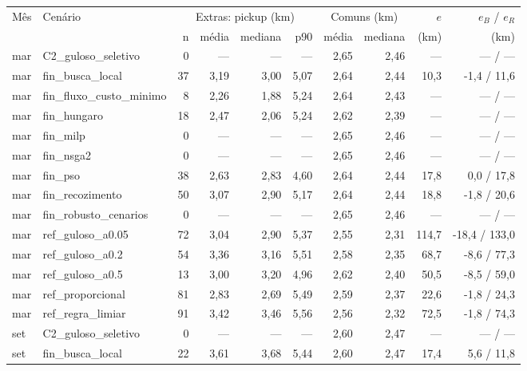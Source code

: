 \begin{tabular}{llrrrrrrrr}
\hline
Mês & Cenário & \multicolumn{4}{c}{Extras: pickup (km)} & \multicolumn{2}{c}{Comuns (km)} & $e$ & $e_B$ / $e_R$ \\
 & & n & média & mediana & p90 & média & mediana & (km) & (km) \\
\hline
mar & C2\_guloso\_seletivo & 0 & --- & --- & --- & 2{,}65 & 2{,}46 & --- & --- / --- \\
mar & fin\_busca\_local & 37 & 3{,}19 & 3{,}00 & 5{,}07 & 2{,}64 & 2{,}44 & 10{,}3 & -1{,}4 / 11{,}6 \\
mar & fin\_fluxo\_custo\_minimo & 8 & 2{,}26 & 1{,}88 & 5{,}24 & 2{,}64 & 2{,}43 & --- & --- / --- \\
mar & fin\_hungaro & 18 & 2{,}47 & 2{,}06 & 5{,}24 & 2{,}62 & 2{,}39 & --- & --- / --- \\
mar & fin\_milp & 0 & --- & --- & --- & 2{,}65 & 2{,}46 & --- & --- / --- \\
mar & fin\_nsga2 & 0 & --- & --- & --- & 2{,}65 & 2{,}46 & --- & --- / --- \\
mar & fin\_pso & 38 & 2{,}63 & 2{,}83 & 4{,}60 & 2{,}64 & 2{,}44 & 17{,}8 & 0{,}0 / 17{,}8 \\
mar & fin\_recozimento & 50 & 3{,}07 & 2{,}90 & 5{,}17 & 2{,}64 & 2{,}44 & 18{,}8 & -1{,}8 / 20{,}6 \\
mar & fin\_robusto\_cenarios & 0 & --- & --- & --- & 2{,}65 & 2{,}46 & --- & --- / --- \\
mar & ref\_guloso\_a0.05 & 72 & 3{,}04 & 2{,}90 & 5{,}37 & 2{,}55 & 2{,}31 & 114{,}7 & -18{,}4 / 133{,}0 \\
mar & ref\_guloso\_a0.2 & 54 & 3{,}36 & 3{,}16 & 5{,}51 & 2{,}58 & 2{,}35 & 68{,}7 & -8{,}6 / 77{,}3 \\
mar & ref\_guloso\_a0.5 & 13 & 3{,}00 & 3{,}20 & 4{,}96 & 2{,}62 & 2{,}40 & 50{,}5 & -8{,}5 / 59{,}0 \\
mar & ref\_proporcional & 81 & 2{,}83 & 2{,}69 & 5{,}49 & 2{,}59 & 2{,}37 & 22{,}6 & -1{,}8 / 24{,}3 \\
mar & ref\_regra\_limiar & 91 & 3{,}42 & 3{,}46 & 5{,}56 & 2{,}56 & 2{,}32 & 72{,}5 & -1{,}8 / 74{,}3 \\
set & C2\_guloso\_seletivo & 0 & --- & --- & --- & 2{,}60 & 2{,}47 & --- & --- / --- \\
set & fin\_busca\_local & 22 & 3{,}61 & 3{,}68 & 5{,}44 & 2{,}60 & 2{,}47 & 17{,}4 & 5{,}6 / 11{,}8 \\

\end{tabular}
